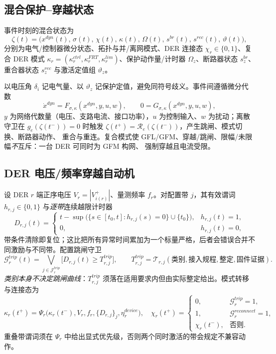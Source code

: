 \subsection{混合保护--穿越状态}\label{sec:rel-pf-state}
\begin{definition}[事件时状态]
事件时刻的混合状态为
\begin{equation}
 \zeta(t)=\big(x^{dyn}(t),\,\sigma(t),\,\chi(t),\,\kappa(t),\,\Omega(t),\,s^{br}(t),\,s^{rec}(t),\,\vartheta(t)\big),
\end{equation}
分别为电气/控制器微分状态、拓扑与并/离网模式、DER 连接态 $\chi_r\in\{0,1\}$、复合 DER 模式
$\kappa_r=(\kappa_r^{ctrl},\kappa_r^{FRT},\kappa_r^{lim})$、保护动作量/计时器 $\Omega_z$、断路器状态
$s_z^{br}$、重合器状态 $s_z^{rec}$ 与激活定值组 $\vartheta_z$。
\end{definition}
以电压角 $\delta_i$ 记电气量、以 $\vartheta_z$ 记保护定值，避免同符号歧义。事件间遵循微分代数
\begin{equation}
 \dot x^{dyn}=F_{\sigma,\kappa}(x^{dyn},y,u,w),\qquad 0=G_{\sigma,\kappa}(x^{dyn},y,u,w),
\end{equation}
$y$ 为网络代数量（电压、支路电流、接口功率），$u$ 为控制输入、$w$ 为扰动；离散守卫在
$g_e(\zeta(t^-))=0$ 时触发 $\zeta(t^+)=\mathcal R_e(\zeta(t^-))$，产生跳闸、模式切换、断路器动作、
重合与重连。复合模式使 GFL/GFM、穿越/跳闸、限幅/未限幅\emph{不}互斥：一台 DER 可同时为 GFM 构网、
强制穿越且电流受限。

\subsection{DER 电压/频率穿越自动机}\label{sec:rel-pf-frt}
设 DER $r$ 端正序电压 $V_r=|V_{i(r)}^{+}|$、量测频率 $f_r$。对配置带 $j$，其有效谓词 $h_{r,j}\in\{0,1\}$
与\emph{逐带}连续越限计时器
\begin{equation}
 D_{r,j}(t)=\begin{cases}t-\sup\big(\{s\in[t_0,t]:h_{r,j}(s)=0\}\cup\{t_0\}\big),&h_{r,j}(t)=1,\\[2pt]0,&h_{r,j}(t)=0,\end{cases}
\end{equation}
带条件清除即复位；这比把所有异常时间累加为一个标量严格，后者会错误合并不同激励与不同带。配置跳闸守卫
\begin{equation}
 \mathcal G_r^{trip}(t)=\bigvee_{j\in\mathcal J_r^{trip}}\big[D_{r,j}(t)\ge T_{r,j}^{trip}\big],\qquad
 T_{r,j}^{trip}=\mathcal T_{r,j}(\text{类别},\text{接入规程},\text{整定},\text{固件证据}).
\end{equation}
\emph{类别本身不决定跳闸曲线}：$T_{r,j}^{trip}$ 须落在适用要求内但由实际整定给出。模式转移与连接态为
\begin{equation}
 \kappa_r(t^+)=\Psi_r\big(\kappa_r(t^-),V_r,f_r,\{D_{r,j}\}_j,\eta_r^{device}\big),\quad
 \chi_r(t^+)=\begin{cases}0,&\mathcal G_r^{trip}=1,\\1,&\mathcal G_r^{reconnect}=1,\\ \chi_r(t^-),&\text{否则}.\end{cases}
\end{equation}
重叠带谓词须在 $\Psi_r$ 中给出显式优先级，否则两个同时激活的带会规定不兼容动作。

